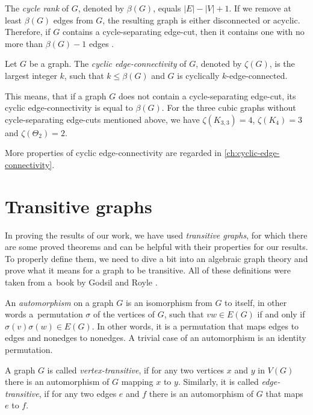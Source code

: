 \documentclass[12pt, twoside]{book}
\begin{document}
The \textit{cycle rank} of $G$, denoted by $\beta(G)$, equals $|E|-|V|+1$. If we remove at least $\beta(G)$ edges from $G$, the resulting graph is either disconnected or acyclic. Therefore, if $G$ contains a cycle-separating edge-cut, then it contains one with no more than $\beta(G)-1$ edges \cite{atoms-of-cyclic}.

\newpage

\begin{definition}
	Let $G$ be a graph. The \textit{cyclic edge-connectivity} of $G$, denoted by $\zeta(G)$, is the largest integer $k$, such that $k\leq \beta(G)$ and $G$ is cyclically $k$-edge-connected.
\end{definition}

This means, that if a graph $G$ does not contain a cycle-separating edge-cut, its cyclic edge-connectivity is equal to $\beta(G)$. For the three cubic graphs without cycle-separating edge-cuts mentioned above, we have $\zeta(K_{3,3})=4$, $\zeta(K_4)=3$ and $\zeta(\Theta_2)=2$.

More properties of cyclic edge-connectivity are regarded in \cref{ch:cyclic-edge-connectivity}.

\section{Transitive graphs}

In proving the results of our work, we have used \textit{transitive graphs}, for which there are some proved theorems and can be helpful with their properties for our results. To properly define them, we need to dive a bit into an algebraic graph theory and prove what it means for a graph to be transitive. All of these definitions were taken from a~book by Godsil and Royle \cite{algebraic-graph-theory}.

An \textit{automorphism} on a graph $G$ is an isomorphism from $G$ to itself, in other words a~permutation $\sigma$ of the vertices of $G$, such that $vw\in E(G)$ if and only if $\sigma(v)\sigma(w)\in E(G)$. In other words, it is a permutation that maps edges to edges and nonedges to nonedges. A trivial case of an automorphism is an identity permutation.

A graph $G$ is called \emph{vertex-transitive}, if for any two vertices $x$ and $y$ in $V(G)$ there is an automorphism of $G$ mapping $x$ to $y$. Similarly, it is called \emph{edge-transitive}, if for any two edges $e$ and $f$ there is an automorphism of $G$ that maps $e$ to $f$.
\end{document}

